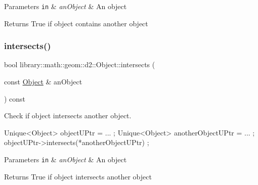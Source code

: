 \begin{DoxyParams}[1]{Parameters}
\mbox{\tt in}  & {\em an\+Object} & An object \\
\hline
\end{DoxyParams}
\begin{DoxyReturn}{Returns}
True if object contains another object 
\end{DoxyReturn}
\mbox{\label{classlibrary_1_1math_1_1geom_1_1d2_1_1_object_a22819b510e52283c19c4ed947e0cba97}} 
\subsubsection{\texorpdfstring{intersects()}{intersects()}}
{\footnotesize\ttfamily bool library\+::math\+::geom\+::d2\+::\+Object\+::intersects (\begin{DoxyParamCaption}\item[{const \hyperlink{classlibrary_1_1math_1_1geom_1_1d2_1_1_object}{Object} \&}]{an\+Object }\end{DoxyParamCaption}) const\hspace{0.3cm}{\ttfamily [virtual]}}



Check if object intersects another object. 


\begin{DoxyCode}
Unique<Object> objectUPtr = ... ;
Unique<Object> anotherObjectUPtr = ... ;
objectUPtr->intersects(*anotherObjectUPtr) ;
\end{DoxyCode}



\begin{DoxyParams}[1]{Parameters}
\mbox{\tt in}  & {\em an\+Object} & An object \\
\hline
\end{DoxyParams}
\begin{DoxyReturn}{Returns}
True if object intersects another object 
\end{DoxyReturn}
\mbox{\label{classlibrary_1_1math_1_1geom_1_1d2_1_1_object_ae9506254971168a3ca63e1923556b70d}} 

